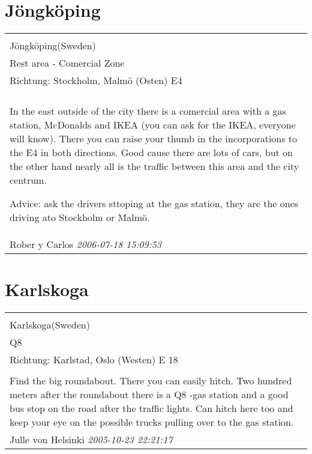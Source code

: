 \documentclass[a4paper,12pt]{article}
\begin{document}
\section{Jöngköping}
\begin{tabular}{|p{13cm}|}
\hline\\
Jöngköping(Sweden)\\
Rest area - Comercial Zone\\
Richtung: Stockholm, Malmö (Osten) E4 \\
\hline\\
In the east outside of the city there is a comercial area with a gas station, McDonalds and IKEA (you can ask for the IKEA, everyone will know). There you can raise your thumb in the incorporations to the E4 in both directions.
Good cause there are lots of cars, but on the other hand nearly all is the traffic between this area and the city centrum.

Advice: ask the drivers sttoping at the gas station, they are the ones driving ato Stockholm or Malmö. \\
Rober y Carlos \textit{ 2006-07-18 15:09:53 }\\\hline
\end{tabular}


\section{Karlskoga}
\begin{tabular}{|p{13cm}|}
\hline\\
Karlskoga(Sweden)\\
Q8\\
Richtung: Karlstad, Oslo (Westen) E 18 \\
\hline\\
Find the big roundabout. There you can easily hitch. Two hundred meters after the roundabout there is a Q8 -gas station and a good bus stop on the road after the traffic lights. Can hitch here too and keep your eye on the possible trucks pulling over to the gas station. \\
Julle von Helsinki \textit{ 2005-10-23 22:21:17 }\\\hline
\end{tabular}
\end{document}
